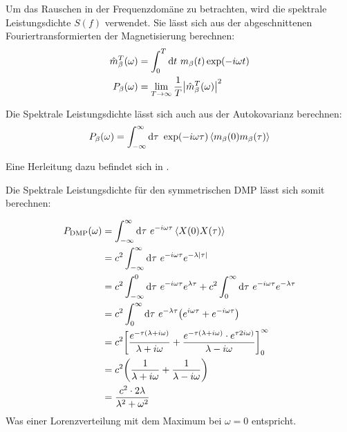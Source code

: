 \documentclass[main.tex]{subfiles}
\begin{document}
Um das Rauschen in der Frequenzdomäne zu betrachten, wird die spektrale
Leistungsdichte \(S(f)\) verwendet. Sie lässt sich aus der abgeschnittenen
Fouriertransformierten der Magnetisierung berechnen:
\begin{align}
	\hat{m}_\beta^T(\omega) & = \int_0^T \mathrm{d} t \ m_\beta(t) \exp(-i \omega
	t)
	\\
	P_{\beta}(\omega)       & = \lim_{T \to \infty} \frac{1}{T}
	\abs{\hat{m}_\beta^T(\omega)}^2
\end{align}

Die Spektrale Leistungsdichte lässt sich auch aus der Autokovarianz berechnen:
\begin{align}
	P_\beta(\omega) = \int_{-\infty}^{\infty} \mathrm{d} \tau \ \exp(-i \omega
	\tau) \expval{m_\beta(0) m_\beta(\tau)}
\end{align}

Eine Herleitung dazu befindet sich in \cite{schlegel-master}.

Die Spektrale Leistungsdichte für den symmetrischen DMP lässt sich somit berechnen:


\begin{align}
	P_\text{DMP}(\omega) &= \int_{-\infty}^{\infty} \dif \tau \ e^{-i \omega \tau} \expval{X(0)X(\tau)}\\
	&= c^2 \int_{-\infty}^{\infty} \dif \tau \ e^{-i \omega \tau}e^{-\lambda \abs{\tau}}\\
	&= c^2 \int_{-\infty}^{0} \dif \tau \ e^{-i \omega \tau}e^{\lambda \tau} + c^2 \int_{0}^{\infty} \dif \tau \ e^{-i \omega \tau}e^{-\lambda \tau}\\
	&= c^2 \int_{0}^{\infty} \dif \tau \ e^{-\lambda \tau} \qty(e^{i \omega \tau} + e^{-i \omega \tau})\\
	&= c^2 \qty[\frac{e^{-\tau(\lambda + i\omega)}}{\lambda + i\omega} + \frac{e^{-\tau(\lambda + i\omega)}\cdot e^{\tau 2 i \omega)}}{\lambda - i\omega}]_{0}^{\infty}\\
	&= c^2\qty(\frac{1}{\lambda + i\omega} + \frac{1}{\lambda - i\omega})\\
	&= \frac{c^2 \cdot 2\lambda}{\lambda^2 + \omega^2}
\end{align}
Was einer Lorenzverteilung mit dem Maximum bei \(\omega=0\) entspricht.

\end{document}
